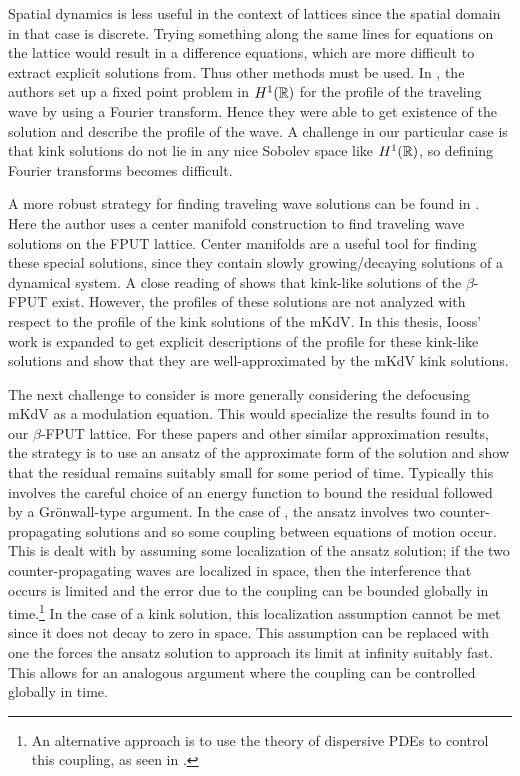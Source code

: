 Spatial dynamics is less useful in the context of lattices since the spatial domain in that case is discrete. Trying something along the same lines for equations on the lattice would result in a difference equations, which are more difficult to extract explicit solutions from. Thus other methods must be used. In \cite{friesecke1999solitary}, the authors set up a fixed point problem in \(H^1(\mathbb{R})\) for the profile of the traveling wave by using a Fourier transform. Hence they were able to get existence of the solution and describe the profile of the wave. A challenge in our particular case is that kink solutions do not lie in any nice Sobolev space like \(H^1(\mathbb{R})\), so defining Fourier transforms becomes difficult.

A more robust strategy for finding traveling wave solutions can be found in \cite{iooss2000travelling}. Here the author uses a center manifold construction to find traveling wave solutions on the FPUT lattice. Center manifolds are a useful tool for finding these special solutions, since they contain slowly growing/decaying solutions of a dynamical system. A close reading of \cite{iooss2000travelling} shows that kink-like solutions of the \(\beta\)-FPUT exist. However, the profiles of these solutions are not analyzed with respect to the profile of the kink solutions of the mKdV. In this thesis, Iooss' work is expanded to get explicit descriptions of the profile for these kink-like solutions and show that they are well-approximated by the mKdV kink solutions.

The next challenge to consider is more generally considering the defocusing mKdV as a modulation equation. This would specialize the results found in \cite{schneider2000counter,khan2017long} to our \(\beta\)-FPUT lattice. For these papers and other similar approximation results, the strategy is to use an ansatz of the approximate form of the solution and show that the residual remains suitably small for some period of time. Typically this involves the careful choice of an energy function  to bound the residual followed by a Gr\"onwall-type argument. In the case of \cite{schneider2000counter}, the ansatz involves two counter-propagating solutions and so some coupling between equations of motion occur. This is dealt with by assuming some localization of the ansatz solution; if the two counter-propagating waves are localized in space, then the interference that occurs is limited and the error due to the coupling can be bounded globally in time.\footnote{An alternative approach is to use the theory of dispersive PDEs to control this coupling, as seen in \cite{hong2021korteweg}.} In the case of a kink solution, this localization assumption cannot be met since it does not decay to zero in space. This assumption can be replaced with one the forces the ansatz solution to approach its limit at infinity suitably fast. This allows for an analogous argument where the coupling can be controlled globally in time. 

